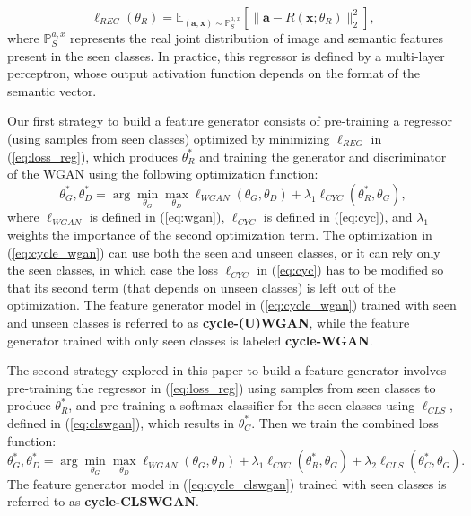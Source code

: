 \documentclass[runningheads]{llncs}
\begin{document}
\begin{equation}
\ell_{REG}(\theta_R) = \mathbb E_{(\mathbf{a},\mathbf{x}) \sim \mathbb P_S^{a,x}} \left [ \|{\mathbf{a} - R(\mathbf{x};\theta_R)}\|_2^2 \right ],
\label{eq:loss_reg}
\end{equation}
where $\mathbb P_S^{a,x}$ represents the real joint distribution of image and semantic features present in the seen classes.  In practice, this regressor is defined by a multi-layer perceptron, whose output activation function  depends on the format of the semantic vector.

Our first strategy to build a feature generator consists of pre-training a regressor (using samples from seen classes) optimized by minimizing $\ell_{REG}$ in (\ref{eq:loss_reg}), which produces $\theta_R^*$ and training the generator and discriminator of the WGAN using the following optimization function:
\begin{equation}
\theta_G^*,\theta_D^* = \arg\min_{\theta_G} \max_{\theta_D} \ell_{WGAN}(\theta_G,\theta_D) + \lambda_1 \ell_{CYC}(\theta_R^*,\theta_G),  
\label{eq:cycle_wgan}
\end{equation}
where $\ell_{WGAN}$ is defined in (\ref{eq:wgan}), $\ell_{CYC}$ is defined in (\ref{eq:cyc}), and $\lambda_1$ weights the importance of the second optimization term.  The optimization in (\ref{eq:cycle_wgan}) can use both the seen and unseen classes, or it can rely only the seen classes, in which case the loss $\ell_{CYC}$ in (\ref{eq:cyc}) has to be modified so that its second term (that depends on unseen classes) is left out of the optimization.  The feature generator model in (\ref{eq:cycle_wgan}) trained with seen and unseen classes is referred to as \textbf{cycle-(U)WGAN}, while the  feature generator trained with only seen classes is labeled \textbf{cycle-WGAN}.

The second strategy explored in this paper to build a feature generator involves pre-training the regressor in (\ref{eq:loss_reg}) using samples from seen classes to produce $\theta_R^*$, and pre-training a softmax classifier for the seen classes using $\ell_{CLS}$, defined in (\ref{eq:clswgan}), which results in $\theta_C^*$.  Then we train the combined loss function:
\begin{equation}
\theta_G^*,\theta_D^* = \arg\min_{\theta_G} \max_{\theta_D} \ell_{WGAN}(\theta_G,\theta_D) + \lambda_1 \ell_{CYC}(\theta_R^*,\theta_G) + \lambda_2\ell_{CLS}(\theta_C^*,\theta_G).  
\label{eq:cycle_clswgan}
\end{equation}
The feature generator model in (\ref{eq:cycle_clswgan}) trained with seen classes is referred to as \textbf{cycle-CLSWGAN}.
\end{document}
